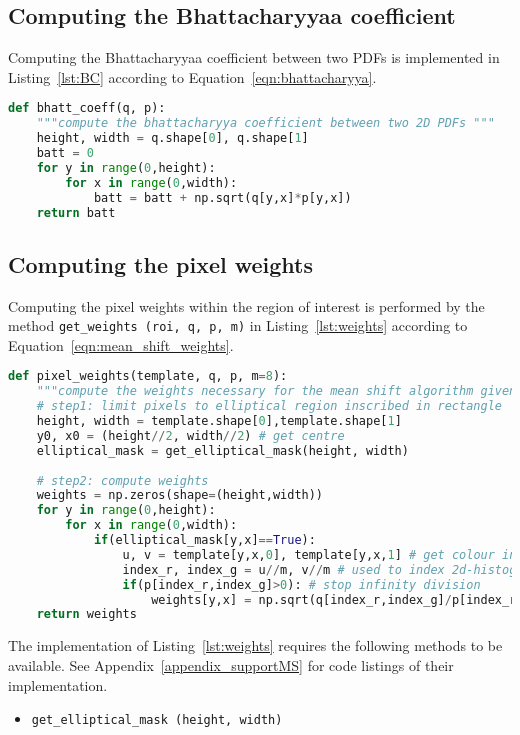 \subsection{Computing the Bhattacharyyaa coefficient}
Computing the Bhattacharyyaa coefficient between two PDFs is implemented in
Listing~\ref{lst:BC} according to Equation~\ref{eqn:bhattacharyya}. 

\begin{lstlisting}[language=Python, caption={Function computing the Bhattacharyya coefficient}, captionpos=b, label={lst:BC}]
def bhatt_coeff(q, p):
    """compute the bhattacharyya coefficient between two 2D PDFs """
    height, width = q.shape[0], q.shape[1]
    batt = 0
    for y in range(0,height):
        for x in range(0,width):
            batt = batt + np.sqrt(q[y,x]*p[y,x])
    return batt
\end{lstlisting}

\subsection{Computing the pixel weights}
Computing the pixel weights within the region of interest is performed by the
method \lstinline{get_weights (roi, q, p, m)} in Listing~\ref{lst:weights} according to Equation~\ref{eqn:mean_shift_weights}.

\begin{lstlisting}[language=Python, caption={Function computing kernel Weights}, captionpos=b, label={lst:weights}]
def pixel_weights(template, q, p, m=8):
    """compute the weights necessary for the mean shift algorithm given q and p"""
    # step1: limit pixels to elliptical region inscribed in rectangle
    height, width = template.shape[0],template.shape[1]
    y0, x0 = (height//2, width//2) # get centre 
    elliptical_mask = get_elliptical_mask(height, width)
    
    # step2: compute weights
    weights = np.zeros(shape=(height,width))
    for y in range(0,height):
        for x in range(0,width): 
            if(elliptical_mask[y,x]==True):  
                u, v = template[y,x,0], template[y,x,1] # get colour index, u 
                index_r, index_g = u//m, v//m # used to index 2d-histogram
                if(p[index_r,index_g]>0): # stop infinity division
                    weights[y,x] = np.sqrt(q[index_r,index_g]/p[index_r,index_g]) # comp weight
    return weights 
\end{lstlisting}

The implementation of Listing~\ref{lst:weights} requires the following methods to
be available. See Appendix~\ref{appendix_supportMS} for code listings of their implementation. 
\begin{itemize}
    \item \lstinline{get_elliptical_mask (height, width)}
\end{itemize}

